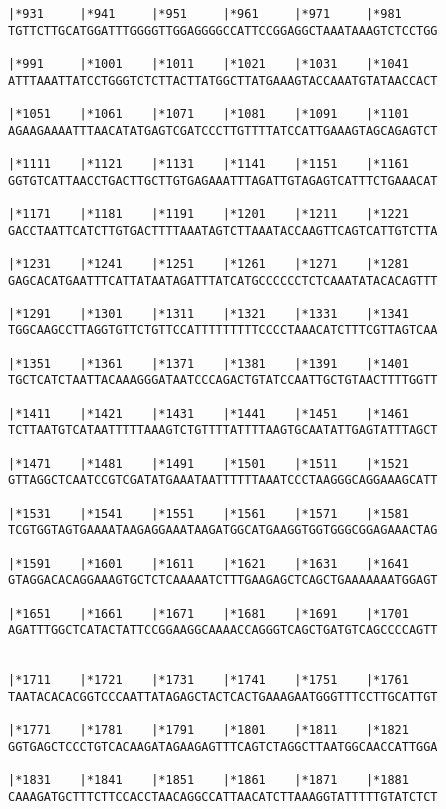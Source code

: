 \documentclass{article}
\begin{document}
\begin{Verbatim}
|*931     |*941     |*951     |*961     |*971     |*981     
TGTTCTTGCATGGATTTGGGGTTGGAGGGGCCATTCCGGAGGCTAAATAAAGTCTCCTGG
  
|*991     |*1001    |*1011    |*1021    |*1031    |*1041    
ATTTAAATTATCCTGGGTCTCTTACTTATGGCTTATGAAAGTACCAAATGTATAACCACT
  
|*1051    |*1061    |*1071    |*1081    |*1091    |*1101    
AGAAGAAAATTTAACATATGAGTCGATCCCTTGTTTTATCCATTGAAAGTAGCAGAGTCT
  
|*1111    |*1121    |*1131    |*1141    |*1151    |*1161    
GGTGTCATTAACCTGACTTGCTTGTGAGAAATTTAGATTGTAGAGTCATTTCTGAAACAT
  
|*1171    |*1181    |*1191    |*1201    |*1211    |*1221    
GACCTAATTCATCTTGTGACTTTTAAATAGTCTTAAATACCAAGTTCAGTCATTGTCTTA
  
|*1231    |*1241    |*1251    |*1261    |*1271    |*1281    
GAGCACATGAATTTCATTATAATAGATTTATCATGCCCCCCTCTCAAATATACACAGTTT
  
|*1291    |*1301    |*1311    |*1321    |*1331    |*1341    
TGGCAAGCCTTAGGTGTTCTGTTCCATTTTTTTTTCCCCTAAACATCTTTCGTTAGTCAA
  
|*1351    |*1361    |*1371    |*1381    |*1391    |*1401    
TGCTCATCTAATTACAAAGGGATAATCCCAGACTGTATCCAATTGCTGTAACTTTTGGTT
  
|*1411    |*1421    |*1431    |*1441    |*1451    |*1461    
TCTTAATGTCATAATTTTTAAAGTCTGTTTTATTTTAAGTGCAATATTGAGTATTTAGCT
  
|*1471    |*1481    |*1491    |*1501    |*1511    |*1521    
GTTAGGCTCAATCCGTCGATATGAAATAATTTTTTAAATCCCTAAGGGCAGGAAAGCATT
  
|*1531    |*1541    |*1551    |*1561    |*1571    |*1581    
TCGTGGTAGTGAAAATAAGAGGAAATAAGATGGCATGAAGGTGGTGGGCGGAGAAACTAG
  
|*1591    |*1601    |*1611    |*1621    |*1631    |*1641    
GTAGGACACAGGAAAGTGCTCTCAAAAATCTTTGAAGAGCTCAGCTGAAAAAAATGGAGT
  
|*1651    |*1661    |*1671    |*1681    |*1691    |*1701    
AGATTTGGCTCATACTATTCCGGAAGGCAAAACCAGGGTCAGCTGATGTCAGCCCCAGTT
  
  
|*1711    |*1721    |*1731    |*1741    |*1751    |*1761    
TAATACACACGGTCCCAATTATAGAGCTACTCACTGAAAGAATGGGTTTCCTTGCATTGT
  
|*1771    |*1781    |*1791    |*1801    |*1811    |*1821    
GGTGAGCTCCCTGTCACAAGATAGAAGAGTTTCAGTCTAGGCTTAATGGCAACCATTGGA
  
|*1831    |*1841    |*1851    |*1861    |*1871    |*1881    
CAAAGATGCTTTCTTCCACCTAACAGGCCATTAACATCTTAAAGGTATTTTTGTATCTCT
  

\end{Verbatim}
\end{document}
